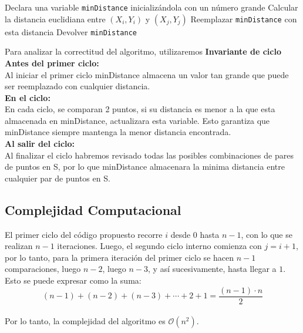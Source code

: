 \documentclass{article}
\begin{document}
\begin{algorithmic}
\State Declara una variable \texttt{minDistance} inicializándola con un número grande
        \State Calcular la distancia euclidiana entre $(X_i, Y_i)$ y $(X_j, Y_j)$
            \State Reemplazar \texttt{minDistance} con esta distancia
        \EndIf
    \EndFor
\EndFor
\State Devolver \texttt{minDistance\\}
\end{algorithmic}
Para analizar la correctitud del algoritmo, utilizaremos \textbf{Invariante de ciclo}
\textbf{Antes del primer ciclo:\\}Al iniciar el primer ciclo minDistance almacena un valor tan grande que puede ser reemplazado con cualquier distancia.\\
\textbf{En el ciclo:\\}
En cada ciclo, se comparan 2 puntos, si su distancia es menor a la que esta almacenada en minDistance, actualizara esta variable.
Esto garantiza que minDistance siempre mantenga la menor distancia encontrada.\\
\textbf{Al salir del ciclo:\\}
Al finalizar el ciclo habremos revisado todas las posibles combinaciones de pares de puntos en S, por lo que minDistance almacenara
la minima distancia entre cualquier par de puntos en S.




\subsection{Complejidad Computacional}
El primer ciclo del código propuesto recorre $i$ desde $0$ hasta $n - 1$, con lo que se realizan $n - 1$ iteraciones. Luego, el segundo ciclo interno comienza con $j = i + 1$, por lo tanto, para la primera iteración del primer ciclo se hacen $n - 1$ comparaciones, luego $n - 2$, luego $n - 3$, y así sucesivamente, hasta llegar a $1$.\\ Esto se puede expresar como la suma:
\[
(n - 1) + (n - 2) + (n - 3) + \cdots + 2 + 1 = \frac{(n - 1) \cdot n}{2}
\]\\Por lo tanto, la complejidad del algoritmo es $\mathcal{O}(n^2)$.

  
\end{document}
